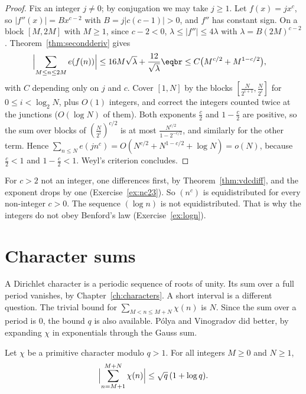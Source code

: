 \begin{proof}
Fix an integer $j\ne0$; by conjugation we may take $j\ge1$. Let $f(x)=jx^c$, so $|f''(x)|=Bx^{c-2}$ with $B=j|c(c-1)|>0$, and $f''$ has constant sign. On a block $[M,2M]$ with $M\ge1$, since $c-2<0$,
$\lambda\le|f''|\le4\lambda$ with $\lambda=B(2M)^{c-2}$. Theorem~\ref{thm:secondderiv} gives
\[
\begin{aligned}\Bigl|\sum_{M\le n\le2M}e(f(n))\Bigr|&\le16M\sqrt\lambda+\frac{12}{\sqrt\lambda}\eqbr\le C\bigl(M^{c/2}+M^{1-c/2}\bigr),\end{aligned}
\]
with $C$ depending only on $j$ and $c$. Cover $[1,N]$ by the blocks $[\frac N{2^{i+1}},\frac N{2^i}]$ for $0\le i<\log_2N$, plus $O(1)$ integers, and correct the integers counted twice at the junctions ($O(\log N)$ of them). Both exponents
$\frac c2$ and $1-\frac c2$ are positive, so the sum over blocks of $(\frac N{2^i})^{c/2}$ is at most $\frac{N^{c/2}}{1-2^{-c/2}}$, and similarly for the other term. Hence $\sum_{n\le N}e(jn^c)=O(N^{c/2}+N^{1-c/2}+\log N)=o(N)$, because
$\frac c2<1$ and $1-\frac c2<1$. Weyl's criterion concludes.
\end{proof}

For $c>2$ not an integer, one differences first, by Theorem~\ref{thm:vdcdiff}, and the exponent drops by one (Exercise~\ref{ex:nc23}). So $(n^c)$ is equidistributed for every non-integer $c>0$. The sequence $(\log n)$ is not equidistributed. That is why the integers do not obey Benford's law (Exercise~\ref{ex:logn}).

\section{Character sums}

A Dirichlet character is a periodic sequence of roots of unity. Its sum over a full period vanishes, by Chapter~\ref{ch:characters}. A short interval is a different question. The trivial bound for $\sum_{M<n\le M+N}\chi(n)$ is $N$. Since the sum over a period is $0$, the bound $q$ is also available. Pólya and Vinogradov did better, by expanding $\chi$ in exponentials through the Gauss sum.

\begin{theorem}\label{thm:pv}
Let $\chi$ be a primitive character modulo $q>1$. For all integers $M\ge0$ and $N\ge1$,
\[
\Bigl|\sum_{n=M+1}^{M+N}\chi(n)\Bigr|\le\sqrt q\,(1+\log q).
\]
\end{theorem}

